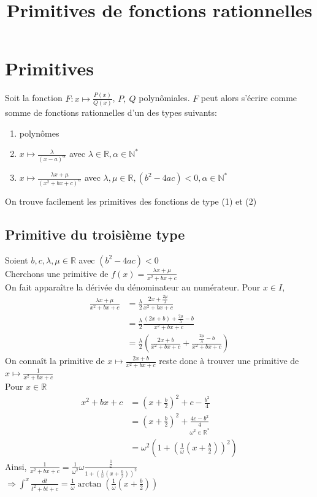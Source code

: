 \documentclass[fleqn]{article}
\title{Primitives de fonctions rationnelles}
\date{}
\theoremstyle{definition} \newtheorem*{defi}{D\'efinition}
\theoremstyle{definition} \newtheorem*{theo}{Th\'eor\`eme}
\theoremstyle{remark} \newtheorem*{rqs}{Remarques}
\theoremstyle{definition} \newtheorem*{prop}{Propri\'et\'e}
\begin{document}
\maketitle

\section{Primitives}
Soit la fonction $F: x \mapsto \frac{P(x)}{Q(x)}$, $P,\ Q$ polyn\^omiales. $F$ peut alors s'\'ecrire comme somme de fonctions rationnelles
d'un des types suivants:
\begin{enumerate}
	\item polyn\^omes
	\item $x \mapsto \frac{\lambda}{(x-a)^{\alpha}}$ avec $\lambda \in \mathbb{R}, \alpha \in \mathbb{N}^{*}$
	\item $x \mapsto \frac{\lambda x + 	\mu}{(x^2 + bx + c)^{\alpha}}$ avec $\lambda, \mu \in \mathbb{R}, (b^2 -4ac) <0 , \alpha
		\in \mathbb{N}^{*}$
\end{enumerate}

On trouve facilement les primitives des fonctions de type (1) et (2)

\subsection{Primitive du troisi\`eme type}
Soient $b,c,\lambda,\mu \in \mathbb{R}$ avec $(b^2 -4ac) <0$ \\
Cherchons une primitive de $f(x) = \frac{\lambda x + 	\mu}{x^2 + bx + c}$ \\
On fait appara\^itre la d\'eriv\'ee du d\'enominateur au num\'erateur. Pour $x \in I,$
\begin{align*}
	\frac{\lambda x + 	\mu}{x^2 + bx + c} &= \frac{\lambda}{2} \frac{2x + \frac{2\mu}{\lambda}}{x^2+bx+c}\\
	&= \frac{\lambda}{2} \frac{(2x + b) + \frac{2\mu}{\lambda} - b}{x^2+bx+c}\\
	&= \frac{\lambda}{2} \left(\frac{2x+b}{x^2+bx+c} + \frac{\frac{2\mu}{\lambda} - b}{x^2+bx+c}\right)
\end{align*}
On conna\^it la primitive de $x \mapsto \frac{2x+b}{x^2+bx+c}$ reste donc \`a trouver une primitive de $x \mapsto \frac{1}{x^2 + bx + c}$\\
Pour $x \in \mathbb{R}$ \begin{align*}
	x^2 + bx + c &= (x+\frac{b}{2})^2 + c - \frac{b^2}{4}\\
	&= (x + \frac{b}{2})^2 + \underset{\omega^2 \in \mathbb{R}^*}{\frac{4c - b^2}{4}}\\
	&= \omega^2 \left(1 + (\frac{1}{\omega} (x + \frac{b}{2}))^2\right)
\end{align*}
Ainsi, $\frac{1}{x^2 + bx + c} = \frac{1}{\omega^2} \omega \frac{\frac{1}{\omega}}{1 + (\frac{1}{\omega}(x +\frac{b}{2}))^2}$\\
$\Rightarrow \int^{x} \frac{dt}{t^2 + bt + c} = \frac{1}{\omega} \arctan (\frac{1}{\omega} (x+ \frac{b}{2}))$
\end{document}
